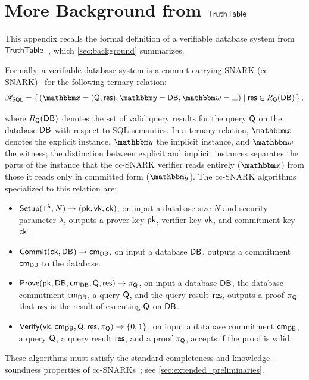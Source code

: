 \section{More Background from \texorpdfstring{$\mathsf{TruthTable}$}{TruthTable}}
\label{sec:more-background}

This appendix recalls the formal definition of a verifiable database system from $\mathsf{TruthTable}$~\cite{cryptoeprint:2026/1260}, which \cref{sec:background} summarizes.

Formally, a verifiable database system is a commit-carrying SNARK (cc-SNARK)~\cite{CampanelliFQ19} for the following ternary relation:
{\small
\begin{displaymath}
 \Relation{\SQL} = \left\{\,
    (
        \NPInstance = (\Query, \QueryResult),
        \NPInstancey = \Database,
        \NPWitness = \bot
    )
  \;\middle|\;
  \QueryResult \in \ResultSet_\Query(\Database)
\,\right\},
\end{displaymath}
}

\noindent
where $R_{\mathsf{Q}}(\mathsf{DB})$ denotes the set of valid query results for the query $\mathsf{Q}$ on the database $\mathsf{DB}$ with respect to SQL semantics.
In a ternary relation, $\NPInstance$ denotes the explicit instance, $\NPInstancey$ the implicit instance, and $\NPWitness$ the witness; the distinction between explicit and implicit instances separates the parts of the instance that the cc-SNARK verifier reads entirely ($\NPInstance$) from those it reads only in committed form ($\NPInstancey$).
The cc-SNARK algorithms specialized to this relation are:
\begin{itemize}[nosep]
    \item $\mathsf{Setup}(1^\lambda, N) \rightarrow (\mathsf{pk}, \mathsf{vk}, \mathsf{ck})$, on input a database size $N$ and security parameter $\lambda$, outputs a prover key $\mathsf{pk}$, verifier key $\mathsf{vk}$, and commitment key $\mathsf{ck}$.
    \item $\mathsf{Commit}(\mathsf{ck}, \mathsf{DB}) \rightarrow \mathsf{cm}_{\mathsf{DB}}$, on input a database $\mathsf{DB}$, outputs a commitment $\mathsf{cm}_{\mathsf{DB}}$ to the database.
    \item $\mathsf{Prove}(\mathsf{pk}, \mathsf{DB}, \mathsf{cm}_{\mathsf{DB}}, \mathsf{Q}, \mathsf{res}) \rightarrow \pi_{\mathsf{Q}}$, on input a database $\mathsf{DB}$, the database commitment $\mathsf{cm}_{\mathsf{DB}}$, a query $\mathsf{Q}$, and the query result $\mathsf{res}$, outputs a proof $\pi_{\mathsf{Q}}$ that $\mathsf{res}$ is the result of executing $\mathsf{Q}$ on $\mathsf{DB}$.
    \item $\mathsf{Verify}(\mathsf{vk}, \mathsf{cm}_{\mathsf{DB}}, \mathsf{Q}, \mathsf{res}, \pi_{\mathsf{Q}}) \rightarrow \{0,1\}$, on input a database commitment $\mathsf{cm}_{\mathsf{DB}}$, a query $\mathsf{Q}$, a query result $\mathsf{res}$, and a proof $\pi_{\mathsf{Q}}$, accepts if the proof is valid.
\end{itemize}
These algorithms must satisfy the standard completeness and knowledge-soundness properties of cc-SNARKs~\cite{CampanelliFQ19}; see \cref{sec:extended_preliminaries}.
